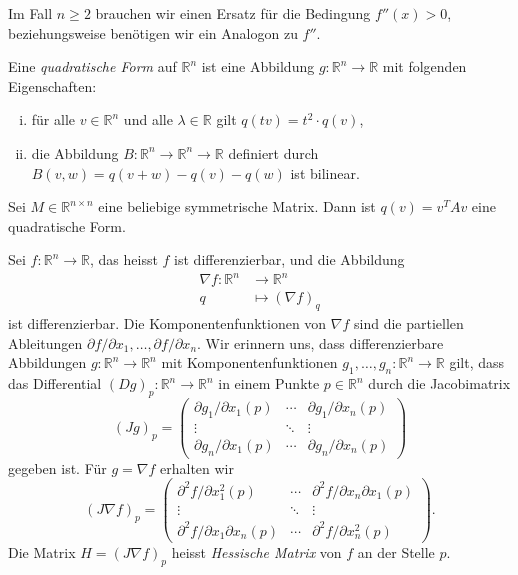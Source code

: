 \documentclass[../main.tex]{subfiles}
\begin{document}
Im Fall $n \geq 2$ brauchen wir einen
Ersatz für die Bedingung $f''(x) > 0$, beziehungsweise
benötigen wir ein Analogon zu $f''$.

\begin{definition}
  Eine \emph{quadratische Form} auf $\mathbb{R}^n$ 
  ist eine Abbildung $g \colon \mathbb{R}^n \to \mathbb{R}$ 
  mit folgenden Eigenschaften:
  \begin{enumerate}[(i)]
    \item für alle $v \in \mathbb{R}^n$ 
      und alle $\lambda \in \mathbb{R}$ gilt $q(tv) = t^2 \cdot q(v)$,
    \item die Abbildung 
      $B \colon \mathbb{R}^n \to \mathbb{R}^n \to \mathbb{R}$ 
      definiert durch $B(v, w) = q(v + w) - q(v) - q(w)$ 
      ist bilinear.
  \end{enumerate}
\end{definition}

\begin{example}
  Sei $M \in \mathbb{R}^{n \times n}$ eine beliebige 
  symmetrische Matrix.
  Dann ist $q(v) = v^T A v$ eine quadratische Form.
\end{example}

Sei $f \colon \mathbb{R}^n \to \mathbb{R}$, das heisst
$f$ ist differenzierbar, und die Abbildung
\begin{align*}
  \nabla f \colon \mathbb{R}^n & \to \mathbb{R}^n \\
  q & \mapsto {(\nabla f)}_q
\end{align*}
ist differenzierbar.
Die Komponentenfunktionen von $\nabla f$ sind die
partiellen Ableitungen $\partial f / \partial x_1, \dots,
\partial f / \partial x_n$.
Wir erinnern uns, dass differenzierbare Abbildungen
$g \colon \mathbb{R}^n \to \mathbb{R}^n$ mit
Komponentenfunktionen $g_1, \dots, g_n \colon \mathbb{R}^n \to \mathbb{R}$ 
gilt, dass das Differential ${(Dg)}_p \colon \mathbb{R}^n \to \mathbb{R}^n$ 
in einem Punkte $p \in \mathbb{R}^n$ durch die
Jacobimatrix 
\[
{(Jg)}_p =
\begin{pmatrix}
  \partial g_1 / \partial x_1 (p) & \cdots & \partial g_1/\partial x_n (p) \\
  \vdots & \ddots & \vdots \\
  \partial g_n / \partial x_1 (p) & \cdots & \partial g_n / \partial x_n (p)
\end{pmatrix}
\]
gegeben ist.
Für $g = \nabla f$ erhalten wir
\[
  {(J \nabla f )}_p =
  \begin{pmatrix}
    \partial^2 f / \partial x_1^2 (p) 
    & \cdots 
    & \partial^2 f / \partial x_n \partial x_1 (p) \\
    \vdots & \ddots & \vdots \\
    \partial^2 f / \partial x_1 \partial x_n (p)
    & \cdots
    & \partial^2 f / \partial x_n^2 (p)
  \end{pmatrix}.
\]
Die Matrix $H = {(J \nabla f)}_p$ heisst \emph{Hessische Matrix}
von $f$ an der Stelle $p$.
\end{document}
